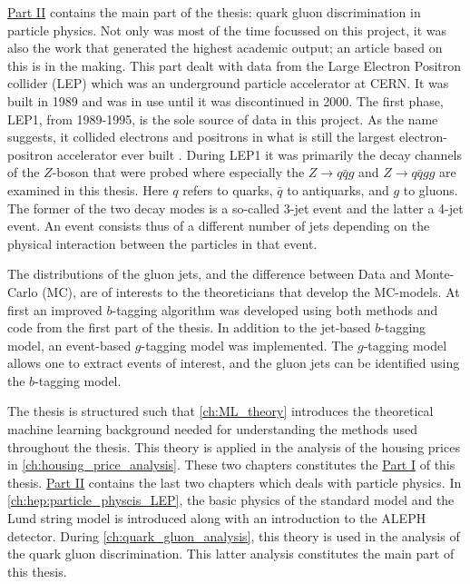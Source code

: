 \clearpage


\hyperref[part2]{Part II} contains the main part of the thesis: quark gluon discrimination in particle physics. Not only was most of the time focussed on this project, it was also the work that generated the highest academic output; an article based on this is in the making. This part dealt with data from the Large Electron Positron collider (LEP) which was an underground particle accelerator at CERN. It was built in \num{1989} and was in use until it was discontinued in \num{2000}. The first phase, LEP1, from \num{1989}-\num{1995}, is the sole source of data in this project. As the name suggests, it collided electrons and positrons in what is still the largest electron-positron accelerator ever built \citep{LargeElectronPositronCollider}. 
During LEP1 it was primarily the decay channels of the $Z$-boson that were probed where especially the $Z\rightarrow q\bar{q}g$ and $Z \rightarrow q\bar{q}gg$ are examined in this thesis. Here $q$ refers to quarks, $\bar{q}$ to antiquarks, and $g$ to gluons. The former of the two decay modes is a so-called 3-jet event and the latter a 4-jet event. An event consists thus of a different number of jets depending on the physical interaction between the particles in that event. 

The distributions of the gluon jets, and the difference between Data and Monte-Carlo (MC), are of interests to the theoreticians that develop the MC-models. At first an improved $b$-tagging algorithm was developed using both methods and code from the first part of the thesis. In addition to the jet-based $b$-tagging model, an event-based $g$-tagging model was implemented. The $g$-tagging model allows one to extract events of interest, and the gluon jets can be identified using the $b$-tagging model. 

The thesis is structured such that \autoref{ch:ML_theory} introduces the theoretical machine learning background needed for understanding the methods used throughout the thesis. This theory is applied in the analysis of the housing prices in \autoref{ch:housing_price_analysis}. These two chapters constitutes the \hyperref[part1]{Part I} of this thesis. \hyperref[part2]{Part II} contains the last two chapters which deals with particle physics. In \autoref{ch:hep:particle_physcis_LEP}, the basic physics of the standard model and the Lund string model is introduced along with an introduction to the ALEPH detector. During \autoref{ch:quark_gluon_analysis}, this theory is used in the analysis of the quark gluon discrimination. This latter analysis constitutes the main part of this thesis. 

